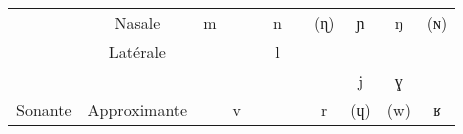 \documentclass[11pt, a4paper]{book}              %
\newcommand{\ipa}[1]{{\phon \mbox{#1}}} %
\begin{document}
\begin{table}[H]
{\begin{tabular}{|c|c|c|c|c|c|c|c|c|c|c|c|}
\cellcolor[HTML]{C0C0C0}                            & \multicolumn{2}{c|}{\cellcolor[HTML]{EFEFEF}Nasale}                                & \ipa{m}                                    & \cellcolor[HTML]{9B9B9B}  & \cellcolor[HTML]{9B9B9B}                   & \ipa{n}                                         & \cellcolor[HTML]{9B9B9B}                   & (\ipa{ɳ})                 & \ipa{ɲ}                        & \ipa{ŋ}                        & (\ipa{ɴ})                 \\ \cline{2-12} 
\cellcolor[HTML]{C0C0C0}                            & \multicolumn{2}{c|}{\cellcolor[HTML]{EFEFEF}Latérale}                              & \cellcolor[HTML]{9B9B9B}                   & \cellcolor[HTML]{9B9B9B}  & \cellcolor[HTML]{9B9B9B}                   & \ipa{l}                                         & \cellcolor[HTML]{9B9B9B}                   & \cellcolor[HTML]{9B9B9B}  & \cellcolor[HTML]{9B9B9B}       & \cellcolor[HTML]{9B9B9B}       & \cellcolor[HTML]{9B9B9B}  \\ \cline{2-12} 
\cellcolor[HTML]{C0C0C0}                            & \multicolumn{2}{c|}{\cellcolor[HTML]{EFEFEF}}                                      & \cellcolor[HTML]{9B9B9B}                   &                           & \cellcolor[HTML]{9B9B9B}                   & \cellcolor[HTML]{9B9B9B}                        & \cellcolor[HTML]{9B9B9B}                   &                           & \ipa{j}                        & \ipa{ɣ}                        &                           \\ \cline{10-11}
\multirow{-4}{*}{\cellcolor[HTML]{C0C0C0}Sonante}   & \multicolumn{2}{c|}{\multirow{-2}{*}{\cellcolor[HTML]{EFEFEF}Approximante}}        & \multirow{-2}{*}{\cellcolor[HTML]{9B9B9B}} & \multirow{-2}{*}{\ipa{v}} & \multirow{-2}{*}{\cellcolor[HTML]{9B9B9B}} & \multirow{-2}{*}{\cellcolor[HTML]{9B9B9B}}      & \multirow{-2}{*}{\cellcolor[HTML]{9B9B9B}} & \multirow{-2}{*}{\ipa{r}} & \multicolumn{1}{l|}{(\ipa{ɥ})} & \multicolumn{1}{l|}{(\ipa{w})} & \multirow{-2}{*}{\ipa{ʁ}} \\ \hline
\end{tabular}
}

\end{table}
\end{document}
